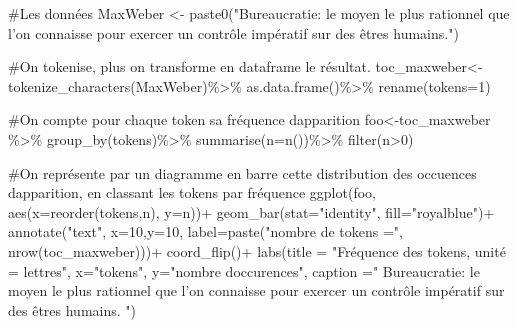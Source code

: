 \documentclass[
  letterpaper,
  DIV=11,
  numbers=noendperiod]{scrreprt}
\newenvironment{Shaded}{\begin{snugshade}}{\end{snugshade}}
\newcommand{\AttributeTok}[1]{\textcolor[rgb]{0.40,0.45,0.13}{#1}}
\newcommand{\CommentTok}[1]{\textcolor[rgb]{0.37,0.37,0.37}{#1}}
\newcommand{\DecValTok}[1]{\textcolor[rgb]{0.68,0.00,0.00}{#1}}
\newcommand{\FunctionTok}[1]{\textcolor[rgb]{0.28,0.35,0.67}{#1}}
\newcommand{\NormalTok}[1]{\textcolor[rgb]{0.00,0.23,0.31}{#1}}
\newcommand{\OtherTok}[1]{\textcolor[rgb]{0.00,0.23,0.31}{#1}}
\newcommand{\SpecialCharTok}[1]{\textcolor[rgb]{0.37,0.37,0.37}{#1}}
\newcommand{\StringTok}[1]{\textcolor[rgb]{0.13,0.47,0.30}{#1}}
\begin{document}
\begin{Shaded}
\begin{Highlighting}[]
\CommentTok{\#Les données}
\NormalTok{MaxWeber }\OtherTok{\textless{}{-}} \FunctionTok{paste0}\NormalTok{(}\StringTok{"Bureaucratie: le moyen le plus rationnel que l’on connaisse pour exercer un contrôle impératif sur des êtres humains."}\NormalTok{)}

\CommentTok{\#On tokenise, plus on transforme en dataframe le résultat.}
\NormalTok{toc\_maxweber}\OtherTok{\textless{}{-}}\FunctionTok{tokenize\_characters}\NormalTok{(MaxWeber)}\SpecialCharTok{\%\textgreater{}\%}
        \FunctionTok{as.data.frame}\NormalTok{()}\SpecialCharTok{\%\textgreater{}\%}
        \FunctionTok{rename}\NormalTok{(}\AttributeTok{tokens=}\DecValTok{1}\NormalTok{)}

\CommentTok{\#On compte pour chaque token sa fréquence d\textquotesingle{}apparition}
\NormalTok{foo}\OtherTok{\textless{}{-}}\NormalTok{toc\_maxweber }\SpecialCharTok{\%\textgreater{}\%} 
        \FunctionTok{group\_by}\NormalTok{(tokens)}\SpecialCharTok{\%\textgreater{}\%} 
        \FunctionTok{summarise}\NormalTok{(}\AttributeTok{n=}\FunctionTok{n}\NormalTok{())}\SpecialCharTok{\%\textgreater{}\%}
        \FunctionTok{filter}\NormalTok{(n}\SpecialCharTok{\textgreater{}}\DecValTok{0}\NormalTok{)}

\CommentTok{\#On représente par un diagramme en barre cette distribution des occuences d\textquotesingle{}apparition, en classant les tokens par fréquence}
\FunctionTok{ggplot}\NormalTok{(foo, }\FunctionTok{aes}\NormalTok{(}\AttributeTok{x=}\FunctionTok{reorder}\NormalTok{(tokens,n), }\AttributeTok{y=}\NormalTok{n))}\SpecialCharTok{+}
               \FunctionTok{geom\_bar}\NormalTok{(}\AttributeTok{stat=}\StringTok{"identity"}\NormalTok{, }\AttributeTok{fill=}\StringTok{"royalblue"}\NormalTok{)}\SpecialCharTok{+}
        \FunctionTok{annotate}\NormalTok{(}\StringTok{"text"}\NormalTok{, }\AttributeTok{x=}\DecValTok{10}\NormalTok{,}\AttributeTok{y=}\DecValTok{10}\NormalTok{, }\AttributeTok{label=}\FunctionTok{paste}\NormalTok{(}\StringTok{"nombre de tokens ="}\NormalTok{, }\FunctionTok{nrow}\NormalTok{(toc\_maxweber)))}\SpecialCharTok{+}
               \FunctionTok{coord\_flip}\NormalTok{()}\SpecialCharTok{+}
        \FunctionTok{labs}\NormalTok{(}\AttributeTok{title =} \StringTok{"Fréquence des tokens, unité = lettres"}\NormalTok{, }
             \AttributeTok{x=}\StringTok{"tokens"}\NormalTok{, }
             \AttributeTok{y=}\StringTok{"nombre d\textquotesingle{}occurences"}\NormalTok{, }
             \AttributeTok{caption =}\StringTok{" \textquotesingle{}Bureaucratie: le moyen le plus rationnel que l’on connaisse pour exercer un contrôle impératif sur des êtres humains.\textquotesingle{} "}\NormalTok{)}
\end{Highlighting}
\end{Shaded}
\end{document}
